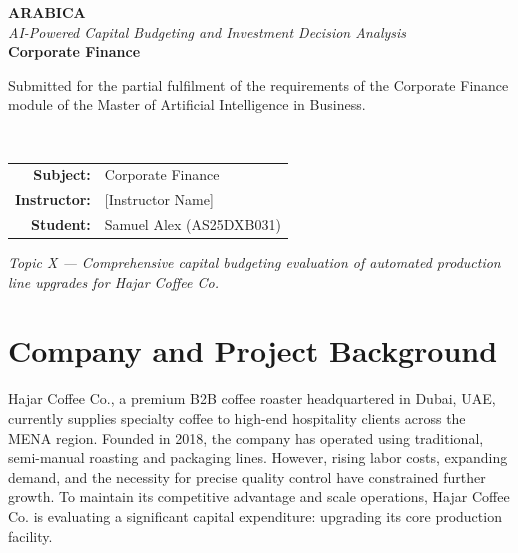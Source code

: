 \documentclass[12pt]{article}
\begin{document}
\pagestyle{empty}

\begin{center}
\vspace*{3.2cm}

{\Huge \textbf{ARABICA}}\\[0.5cm]
{\Large \textit{AI-Powered Capital Budgeting and Investment Decision Analysis}}\\[2.2cm]

{\large \textbf{Corporate Finance}}\\[0.5cm]
\parbox{11cm}{\centering Submitted for the partial fulfilment of the requirements of the Corporate Finance module of the Master of Artificial Intelligence in Business.}\\[2.5cm]

\renewcommand{\arraystretch}{1.6}
\begin{tabular}{rl}
\textbf{Subject:} & Corporate Finance \\
\textbf{Instructor:} & [Instructor Name] \\
\textbf{Student:} & Samuel Alex (AS25DXB031) \\
\end{tabular}

\vfill

\textit{Topic X --- Comprehensive capital budgeting evaluation of automated production line upgrades for Hajar Coffee Co.}

\vspace*{1.6cm}
\end{center}

\newpage
\pagestyle{plain}
\setcounter{page}{1}
\onehalfspacing

\section{Company and Project Background}
Hajar Coffee Co., a premium B2B coffee roaster headquartered in Dubai, UAE, currently supplies specialty coffee to high-end hospitality clients across the MENA region. Founded in 2018, the company has operated using traditional, semi-manual roasting and packaging lines. However, rising labor costs, expanding demand, and the necessity for precise quality control have constrained further growth. To maintain its competitive advantage and scale operations, Hajar Coffee Co. is evaluating a significant capital expenditure: upgrading its core production facility.
\end{document}
